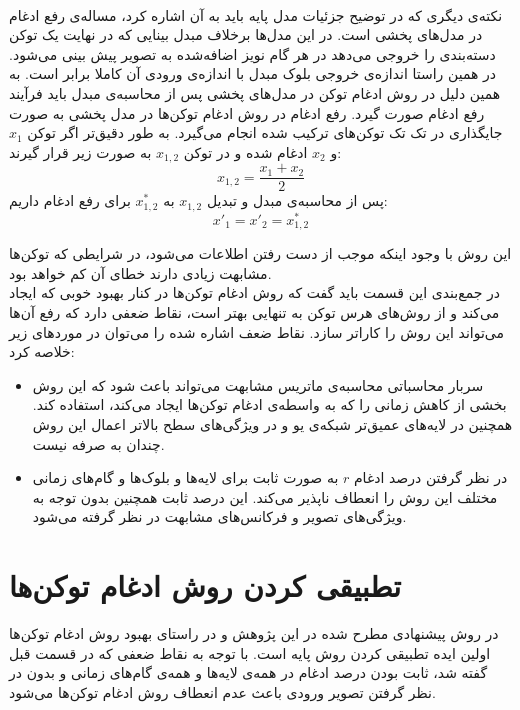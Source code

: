 \\
نکته‌ی دیگری که در توضیح جزئیات مدل پایه باید به آن اشاره کرد، مساله‌ی رفع ادغام در مدل‌های پخشی است. در این مدل‌ها برخلاف مبدل بینایی که در نهایت یک توکن دسته‌بندی را خروجی می‌دهد در هر گام نویز اضافه‌شده به تصویر پیش بینی می‌شود. در همین راستا اندازه‌ی خروجی بلوک مبدل با اندازه‌ی ورودی آن کاملا برابر است. به همین دلیل در روش ادغام توکن در مدل‌های پخشی پس از محاسبه‌ی مبدل باید فرآیند رفع ادغام صورت گیرد. رفع ادغام در روش ادغام توکن‌ها در مدل پخشی به صورت جایگذاری در تک تک توکن‌های ترکیب شده انجام می‌گیرد. به طور دقیق‌تر اگر توکن $x_1$ و $x_2$ ادغام شده و در توکن $x_{1,2}$  به صورت زیر قرار گیرند:
\begin{equation}
	x_{1,2} = \frac{x_1 + x_2}{2}
\end{equation}
پس از محاسبه‌ی مبدل و تبدیل $x_{1,2}$  به $x^*_{1,2}$ برای رفع ادغام داریم:
\begin{equation}
	x'_1 = x'_2 = x^*_{1,2}
\end{equation}

این روش با وجود اینکه موجب از دست رفتن اطلاعات می‌شود، در شرایطی که توکن‌ها مشابهت زیادی دارند خطای‌ آن کم خواهد بود.
\\
در جمع‌بندی این قسمت باید گفت که روش ادغام توکن‌ها در کنار بهبود خوبی که ایجاد می‌کند و از روش‌های هرس توکن به تنهایی بهتر است، نقاط ضعفی دارد که رفع آن‌ها می‌تواند این روش را کاراتر سازد. نقاط ضعف اشاره شده را می‌توان در مورد‌های زیر خلاصه کرد:
\begin{itemize}
	\item سربار محاسباتی محاسبه‌ی ماتریس مشابهت می‌تواند باعث شود که این روش بخشی از کاهش زمانی را که به واسطه‌ی ادغام توکن‌ها ایجاد می‌کند، استفاده کند. همچنین در لایه‌های عمیق‌تر شبکه‌ی یو و در ویژگی‌های سطح بالاتر اعمال این روش چندان به صرفه نیست.
	
	\item
	در نظر گرفتن درصد ادغام $r$ به صورت ثابت برای لایه‌ها و بلوک‌ها و گام‌های زمانی مختلف این روش را انعطاف ناپذیر می‌کند. این درصد ثابت همچنین بدون توجه به ویژگی‌های تصویر و فرکانس‌های مشابهت در نظر گرفته می‌شود.
\end{itemize} 

\section{تطبیقی کردن روش ادغام توکن‌ها}
در روش پیشنهادی مطرح شده در این پژوهش و در راستای بهبود روش ادغام توکن‌ها اولین ایده تطبیقی کردن روش پایه است. با توجه به نقاط ضعفی که در قسمت قبل گفته شد، ثابت بودن درصد ادغام در همه‌ی لایه‌ها و همه‌ی گام‌های زمانی و بدون در نظر گرفتن تصویر ورودی باعث عدم انعطاف روش ادغام توکن‌ها می‌شود. 
\\

